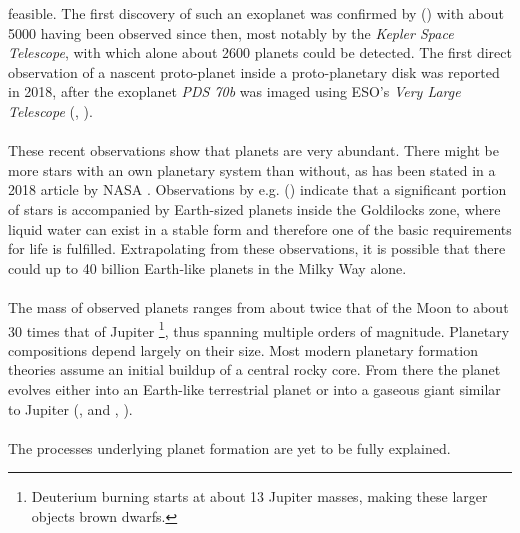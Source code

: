     feasible. The first discovery of such an exoplanet was confirmed by
    \citeauthor{Wolszczan_1992} (\citeyear{Wolszczan_1992}) 
    with about 5000 having been observed since then, most 
    notably by the \textit{Kepler Space Telescope}, with which alone about 2600
    planets could be detected. The first direct observation of a 
    nascent proto-planet inside a proto-planetary disk was reported in 2018,
    after the exoplanet \textit{PDS 70b} was imaged using ESO's 
    \textit{Very Large Telescope} (\citeauthor{Keppler_2018},
    \citeyear{Keppler_2018}).
    \\
    \\
    These recent observations show that planets are very abundant. 
    There might be more stars with an own 
    planetary system than without, as has been stated in a 2018 article by 
    NASA \cite{more_stars_with_planets_than_without}.
    Observations by e.g. \citeauthor{Petigura_2013} 
    (\citeyear{Petigura_2013}) indicate that a significant portion of 
    stars is accompanied by Earth-sized planets 
    inside the Goldilocks zone, where liquid water can exist in a stable 
    form and therefore one of the basic requirements for life is fulfilled.
    Extrapolating from these observations, it is possible that there could up 
    to 40 billion Earth-like planets in the Milky Way alone. \\
    \\
    The mass of observed planets ranges from about twice that of the Moon 
    to about 30 times that of Jupiter
    \footnote{Deuterium burning starts at about 13 Jupiter masses, making these 
    larger objects brown dwarfs.}, thus spanning multiple orders of 
    magnitude. 
    Planetary compositions depend largely on their size.
    Most modern planetary formation theories assume an initial buildup of a 
    central rocky core. From there the planet evolves either into an Earth-like 
    terrestrial planet or into a gaseous giant similar to Jupiter
    (\citeauthor{Pollack_1996}, \citeyear{Pollack_1996} and 
    \citeauthor{Kley_1999}, \citeyear{Kley_1999}). \\
    \\
    The processes underlying planet formation are yet to be fully explained. 
